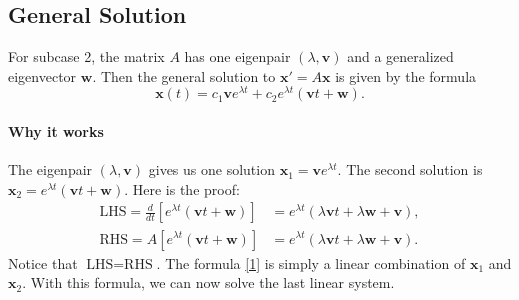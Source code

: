 \documentclass[11pt,letterpaper]{article}
\begin{document}



\subsection{General Solution}
For subcase 2, the matrix $A$ has one eigenpair $(\lambda,\mathbf{v})$ and a generalized eigenvector $\textbf{w}$. Then the general solution to $\textbf{x}'=A\textbf{x}$ is given by the formula
\begin{equation} \label{1}    
\boxed{
\mathbf{x}(t)=c_1\mathbf{v}e^{\lambda t}
+c_2e^{\lambda t}(\mathbf{v}t+\mathbf{w}).
}
\end{equation}


\paragraph{Why it works}
The eigenpair $(\lambda,\mathbf{v})$ gives us one solution $\textbf{x}_1=\mathbf{v}e^{\lambda t}$. The second solution is $\textbf{x}_2=e^{\lambda t}(\mathbf{v}t+\mathbf{w})$. Here is the proof:
\begin{align*}
\text{LHS}=\frac{d}{dt}\left[e^{\lambda t}(\mathbf{v}t+\mathbf{w})\right]
&=e^{\lambda t}(\lambda\mathbf{v}t+\lambda\mathbf{w}+\mathbf{v}),\\
\text{RHS}=A\left[e^{\lambda t}(\mathbf{v}t+\mathbf{w})\right]
&=e^{\lambda t}(\lambda\mathbf{v}t+\lambda\mathbf{w}+\mathbf{v}).
\end{align*}
Notice that $\text{LHS}=\text{RHS}$. 
The formula \eqref{1} is simply a linear combination of $\textbf{x}_1$ and $\textbf{x}_2$. With this formula, we can now solve the last linear system.
\end{document}
